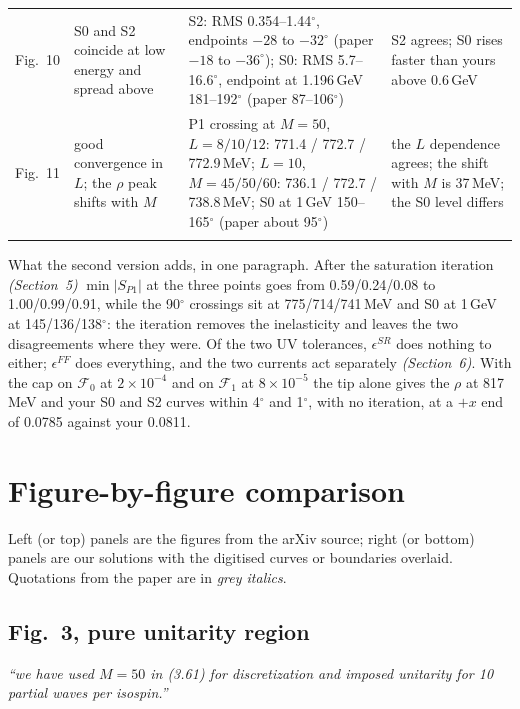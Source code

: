 \documentclass[11pt,a4paper]{article}
\newcommand{\paper}[1]{{\color{quote}\itshape #1}}
\newcommand{\note}[1]{{\color{quote}\itshape (#1)}}
\begin{document}
\begin{table}[H]
\begin{tabularx}{\textwidth}{@{}lP{0.23\textwidth}YP{0.21\textwidth}@{}}
Fig.~10 & S0 and S2 coincide at low energy and spread above & S2: RMS 0.354--1.44$^\circ$, endpoints $-28$ to $-32^\circ$ (paper $-18$ to $-36^\circ$); S0: RMS 5.7--16.6$^\circ$, endpoint at 1.196\,GeV 181--192$^\circ$ (paper 87--106$^\circ$) & S2 agrees; S0 rises faster than yours above 0.6\,GeV \\\addlinespace
Fig.~11 & good convergence in $L$; the $\rho$ peak shifts with $M$ & P1 crossing at $M=50$, $L=8/10/12$: 771.4 / 772.7 / 772.9\,MeV; $L=10$, $M=45/50/60$: 736.1 / 772.7 / 738.8\,MeV; S0 at 1\,GeV 150--165$^\circ$ (paper about 95$^\circ$) & the $L$ dependence agrees; the shift with $M$ is 37\,MeV; the S0 level differs \\\addlinespace
\bottomrule
\end{tabularx}
\end{table}


What the second version adds, in one paragraph. After the saturation iteration \note{Section~5} $\min|S_{P1}|$ at the three points goes from 0.59/0.24/0.08 to 1.00/0.99/0.91, while the 90$^\circ$ crossings sit at 775/714/741\,MeV and S0 at 1\,GeV at 145/136/138$^\circ$: the iteration removes the inelasticity and leaves the two disagreements where they were. Of the two UV tolerances, $\epsilon^{SR}$ does nothing to either; $\epsilon^{FF}$ does everything, and the two currents act separately \note{Section~6}. With the cap on $\mathcal F_0$ at $2\times10^{-4}$ and on $\mathcal F_1$ at $8\times10^{-5}$ the tip alone gives the $\rho$ at 817\,MeV and your S0 and S2 curves within 4$^\circ$ and 1$^\circ$, with no iteration, at a $+x$ end of 0.0785 against your 0.0811.


\section{Figure-by-figure comparison}
Left (or top) panels are the figures from the arXiv source; right (or bottom) panels are our solutions with the digitised curves or boundaries overlaid. Quotations from the paper are in \paper{grey italics}.

\subsection{Fig.~3, pure unitarity region}
\paper{``we have used $M=50$ in (3.61) for discretization and imposed unitarity for 10 partial waves per isospin.''}
\end{document}
